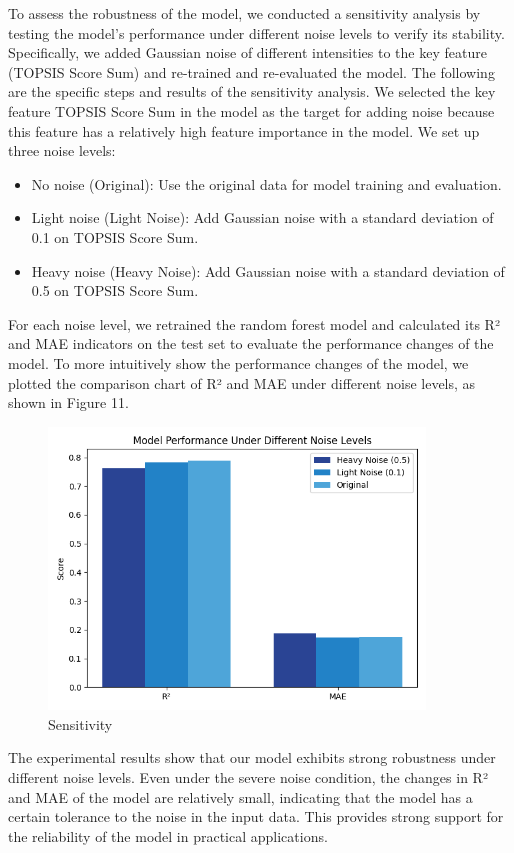 \documentclass{mcmthesis}  %
\begin{document}
\hspace*{1.5em}To assess the robustness of the model, we conducted a sensitivity analysis by testing the model's performance under different noise levels to verify its stability. Specifically, we added Gaussian noise of different intensities to the key feature (TOPSIS Score Sum) and re-trained and re-evaluated the model. The following are the specific steps and results of the sensitivity analysis. 
We selected the key feature TOPSIS Score Sum in the model as the target for adding noise because this feature has a relatively high feature importance in the model. We set up three noise levels:
\begin{itemize}  %
\item No noise (Original): Use the original data for model training and evaluation.
\item Light noise (Light Noise): Add Gaussian noise with a standard deviation of 0.1 on TOPSIS Score Sum.
\item Heavy noise (Heavy Noise): Add Gaussian noise with a standard deviation of 0.5 on TOPSIS Score Sum.
\end{itemize}  %
\hspace*{1.5em}For each noise level, we retrained the random forest model and calculated its R² and MAE indicators on the test set to evaluate the performance changes of the model.
To more intuitively show the performance changes of the model, we plotted the comparison chart of R² and MAE under different noise levels, as shown in Figure 11. 
\begin{figure}[H]  %
\small
\centering  %
\includegraphics[width=10cm]{Sensitivity.png}  %
\caption{Sensitivity}
\end{figure}  %
The experimental results show that our model exhibits strong robustness under different noise levels. Even under the severe noise condition, the changes in R² and MAE of the model are relatively small, indicating that the model has a certain tolerance to the noise in the input data. This provides strong support for the reliability of the model in practical applications.
\end{document}
